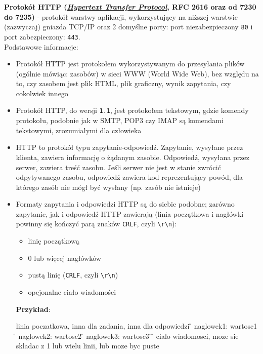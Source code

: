 
\noindent \textbf{Protokół HTTP (\href{http://www.jmarshall.com/easy/http/}{\textit{Hypertext Transfer Protocol}}, RFC 2616 oraz od 7230 do 7235)} - protokół warstwy aplikacji, wykorzystujący na niższej warstwie (zazwyczaj) gniazda TCP/IP oraz 2 domyślne porty: port niezabezpieczony \texttt{80} i port zabezpieczony: \texttt{443}.\\


\noindent Podstawowe informacje:

\begin{itemize}
\item Protokół HTTP jest protokołem wykorzystywanym do przesyłania plików (ogólnie mówiąc: zasobów) w sieci WWW (World Wide Web), bez względu na to, czy zasobem jest plik HTML, plik graficzny, wynik zapytania, czy cokolwiek innego
\item Protokół HTTP, do wersji \texttt{1.1}, jest protokołem tekstowym, gdzie komendy protokołu, podobnie jak w SMTP, POP3 czy IMAP są komendami tekstowymi, zrozumiałymi dla człowieka
\item HTTP to protokół typu zapytanie-odpowiedź. Zapytanie, wysyłane przez klienta, zawiera informację o żądanym zasobie. Odpowiedź, wysyłana przez serwer, zawiera treść zasobu. Jeśli serwer nie jest w stanie zwrócić odpytywanego zasobu, odpowiedź zawiera kod reprezentujący powód, dla którego zasób nie mógł być wysłany (np. zasób nie istnieje)
\item Formaty zapytania i odpowiedzi HTTP są do siebie podobne; zarówno zapytanie, jak i odpowiedź HTTP zawierają (linia początkowa i nagłówki powinny się kończyć parą znaków \texttt{CRLF},  czyli \texttt{\textbackslash r\textbackslash n}):

\begin{itemize}
\item linię początkową 
\item 0 lub więcej nagłówków
\item pustą linię (\texttt{CRLF},  czyli \texttt{\textbackslash r\textbackslash n})
\item opcjonalne ciało wiadomości
\end{itemize}

\textbf{Przykład}:\\

\begin{code}
linia poczatkowa, inna dla zadania, inna dla odpowiedzi \r\n
naglowek1: wartosc1 \r\n
naglowek2: wartosc2 \r\n
naglowek3: wartosc3 \r\n
\r\n
cialo wiadomosci, moze sie skladac z 1 lub
wielu linii, lub moze byc puste
\end{code}


\end{itemize}
